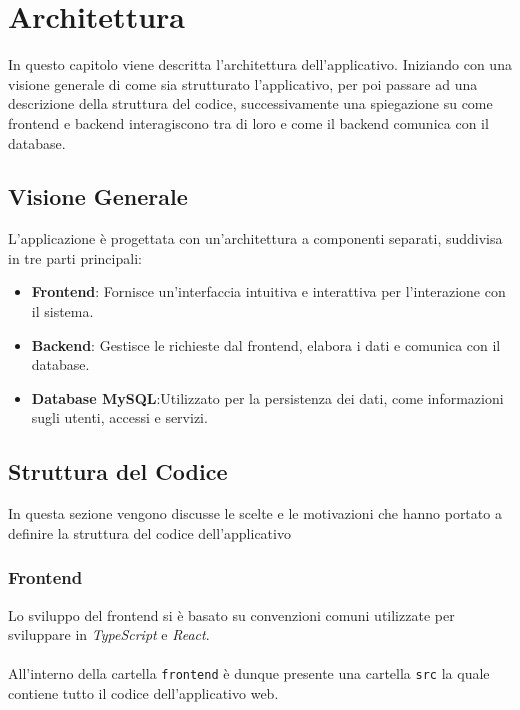 \documentclass[twoside]{supsistudent}
\begin{document}
\chapter{Architettura}

In questo capitolo viene descritta l’architettura dell’applicativo. Iniziando con una visione generale di come sia strutturato l’applicativo, per poi passare ad una descrizione della struttura del codice, successivamente una spiegazione su come frontend e backend interagiscono tra di loro e come il backend comunica con il database.

\section{Visione Generale}

L'applicazione è progettata con un'architettura a componenti separati, suddivisa in tre parti principali:

\begin{itemize}
  \item \textbf{Frontend}: Fornisce un'interfaccia intuitiva e interattiva per l'interazione con il sistema.
  \item \textbf{Backend}: Gestisce le richieste dal frontend, elabora i dati e comunica con il database.
  \item \textbf{Database MySQL}:Utilizzato per la persistenza dei dati, come informazioni sugli utenti, accessi e servizi.
\end{itemize}



\section{Struttura del Codice}
In questa sezione vengono discusse le scelte e le motivazioni che hanno portato a definire la struttura del codice dell’applicativo

\subsection{Frontend}
Lo sviluppo del frontend si è basato su convenzioni comuni utilizzate per sviluppare in \textit{TypeScript} e \textit{React}.
\\\\
All'interno della cartella \texttt{frontend} è dunque presente una cartella \texttt{src} la quale contiene tutto il codice dell'applicativo web.
\end{document}

